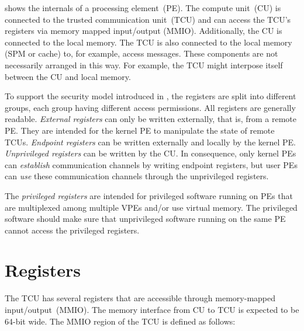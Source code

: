  shows the internals of a processing element~(PE). The compute unit~(CU) is
connected to the trusted communication unit~(TCU) and can access the TCU's registers via memory
mapped input/output (MMIO). Additionally, the CU is connected to the local memory. The TCU is also
connected to the local memory (SPM or cache) to, for example, access messages. These components are
not necessarily arranged in this way. For example, the TCU might interpose itself between the CU and
local memory.

To support the security model introduced in , the registers are split into
different groups, each group having different access permissions. All registers are generally
readable. \emph{External registers} can only be written externally, that is, from a remote PE. They
are intended for the kernel PE to manipulate the state of remote TCUs. \emph{Endpoint registers} can
be written externally and locally by the kernel PE. \emph{Unprivileged registers} can be written by
the CU. In consequence, only kernel PEs can \emph{establish} communication channels by writing
endpoint registers, but user PEs can \emph{use} these communication channels through the
unprivileged registers.

 The \emph{privileged registers} are intended for privileged software running on PEs
that are multiplexed among multiple VPEs and/or use virtual memory. The privileged software should
make sure that unprivileged software running on the same PE cannot access the privileged registers.
\extend{}

\section{Registers}

The TCU has several registers that are accessible through memory-mapped input/output~(MMIO). The
memory interface from CU to TCU is expected to be 64-bit wide. The MMIO region of the TCU is defined
as follows:


